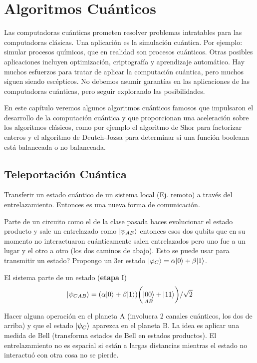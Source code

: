 \chapter{Algoritmos Cuánticos}
Las computadoras cuánticas prometen resolver problemas intratables para las computadoras clásicas. Una aplicación es la simulación cuántica. Por ejemplo: simular procesos químicos, que en realidad son procesos cuánticos. Otras posibles aplicaciones incluyen optimización, criptografía y aprendizaje automático. Hay muchos esfuerzos para tratar de aplicar la computación cuántica, pero muchos siguen siendo escépticos. No debemos asumir garantías en las aplicaciones de las computadoras cuánticas, pero seguir explorando las posibilidades.

En este capítulo veremos algunos algoritmos cuánticos famosos que impulsaron el desarrollo de la computación cuántica y que proporcionan una aceleración sobre los algoritmos clásicos, como por ejemplo el algoritmo de Shor para factorizar enteros y el algoritmo de Deutch-Jozsa para determinar si una función booleana está balanceada o no balanceada.

\section{Teleportación Cuántica}

Transferir un estado cuántico de un sistema local (Ej. remoto) a través
del entrelazamiento. Entonces es una nueva forma de comunicación. 

Parte de un circuito como el de la clase pasada haces evolucionar
el estado producto y sale un entrelazado como $\KET{\psi_{AB}}$ entonces
esos dos qubits que en su momento no interactuaron cuánticamente salen
entrelazados pero uno fue a un lugar y el otro a otro (los dos caminos
de abajo). Esto se puede usar para transmitir un estado? Propongo
un 3er estado $\KET{\varphi_{C}}=\alpha\KET 0+\beta\KET 1$.

El sistema parte de un estado (\textbf{etapa }I)
\[
\KET{\psi_{CAB}}=\PARENTESIS{\alpha\KET 0+\beta\KET 1}\PARENTESIS{\underset{AB}{\KET{00}}+\KET{11}}/\sqrt{2}
\]

Hacer alguna operación en el planeta A (involucra 2 canales cuánticos,
los dos de arriba) y que el estado $\KET{\psi_{C}}$ aparezca en el
planeta B. La idea es aplicar una medida de Bell (transforma estados
de Bell en estados productos). El entrelazamiento no es espacial si
están a largas distancias mientras el estado no interactuó con otra
cosa no se pierde.

